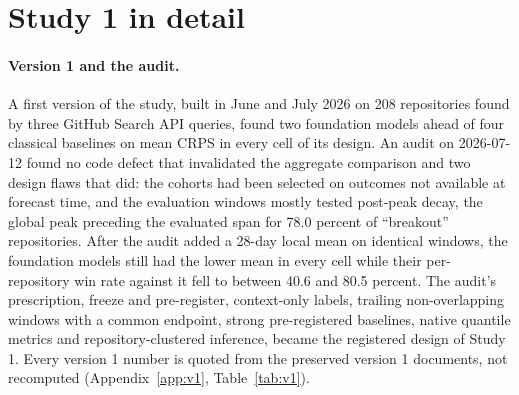 \providecommand{\lm}{\texttt{local\_mean\_28}}
\providecommand{\aets}{\texttt{autoets\_weekly}}
\providecommand{\qs}{QScore9}

\section{Study 1 in detail}
\label{app:study1}
\label{sec:results}

\paragraph{Version 1 and the audit.} A first version of the study, built in June and July 2026 on 208
repositories found by three GitHub Search API queries, found two foundation models ahead of four classical
baselines on mean CRPS in every cell of its design. An audit on 2026-07-12 found no code defect that
invalidated the aggregate comparison and two design flaws that did: the cohorts had been selected on
outcomes not available at forecast time, and the evaluation windows mostly tested post-peak decay, the global
peak preceding the evaluated span for 78.0 percent of ``breakout'' repositories. After the audit added a
28-day local mean on identical windows, the foundation models still had the lower mean in every cell while
their per-repository win rate against it fell to between 40.6 and 80.5 percent. The audit's prescription,
freeze and pre-register, context-only labels, trailing non-overlapping windows with a common endpoint, strong
pre-registered baselines, native quantile metrics and repository-clustered inference, became the registered
design of Study 1. Every version 1 number is quoted from the preserved version 1 documents, not recomputed
(Appendix~\ref{app:v1}, Table~\ref{tab:v1}).

